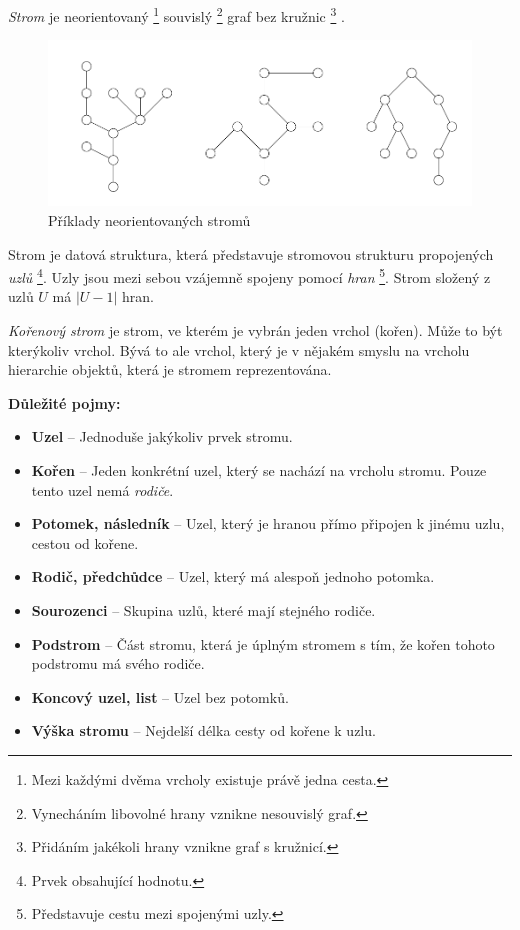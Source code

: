 \documentclass[
  biblatex=false,
  font=serif,
  glossaries=false,
  tables=false,
  theorems=false,
  index
]{kidiplom}
\begin{document}
\begin{definition}[Strom]
\indent \textit{Strom} je neorientovaný \footnote{Mezi každými dvěma vrcholy existuje právě jedna cesta.} souvislý \footnote{Vynecháním libovolné hrany vznikne nesouvislý graf.} graf bez kružnic \footnote{Přidáním jakékoli hrany vznikne graf s kružnicí.} \cite{belohlavekALM}.
\end{definition}
\begin{figure}[h!]
\centering
	\includegraphics[scale=0.6]{obrazky/1Stromy.png}
	\caption{Příklady neorientovaných stromů}
\end{figure}

\medskip
\noindent Strom je datová struktura, která představuje stromovou strukturu propojených \textit{uzlů} \footnote{Prvek obsahující hodnotu.}. Uzly jsou mezi sebou vzájemně spojeny pomocí \textit{hran} \footnote{Představuje cestu mezi spojenými uzly.}. Strom složený z uzlů $U$ má $|U - 1|$ hran.


\begin{definition}
\indent \textit{Kořenový strom} je strom, ve kterém je vybrán jeden vrchol (kořen). Může to být kterýkoliv vrchol. Bývá to ale vrchol, který je v nějakém smyslu na vrcholu hierarchie objektů, která je stromem reprezentována.
\cite{belohlavekALM}
\end{definition}
\smallskip

\newpage
\noindent \textbf{Důležité pojmy:}
\begin{itemize}
\item \textbf{Uzel} -- Jednoduše jakýkoliv prvek stromu.
\item \textbf{Kořen} -- Jeden konkrétní uzel, který se nachází na vrcholu stromu. Pouze tento uzel nemá \textit{rodiče}. 
\item \textbf{Potomek, následník} -- Uzel, který je hranou přímo připojen k jinému uzlu, cestou od kořene.
\item \textbf{Rodič, předchůdce} -- Uzel, který má alespoň jednoho potomka.
\item \textbf{Sourozenci} -- Skupina uzlů, které mají stejného rodiče.
\item \textbf{Podstrom} -- Část stromu, která je úplným stromem s tím, že kořen tohoto podstromu má svého rodiče.
\item \textbf{Koncový uzel, list} -- Uzel bez potomků. 
\item \textbf{Výška stromu} -- Nejdelší délka cesty od kořene k uzlu.
\end{itemize} 
\end{document}
